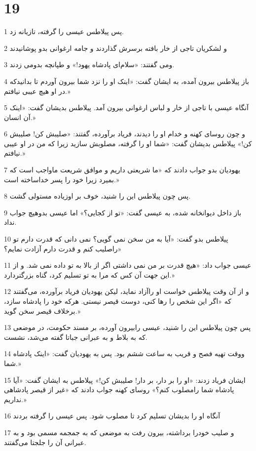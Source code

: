 \chapter{19}

\par 1 پس پیلاطس عیسی را گرفته، تازیانه زد.
\par 2 و لشکریان تاجی از خار بافته برسرش گذاردند و جامه ارغوانی بدو پوشانیدند
\par 3 ومی گفتند: «سلام‌ای پادشاه یهود!» و طپانچه بدومی زدند.
\par 4 باز پیلاطس بیرون آمده، به ایشان گفت: «اینک او را نزد شما بیرون آوردم تا بدانیدکه در او هیچ عیبی نیافتم.»
\par 5 آنگاه عیسی با تاجی از خار و لباس ارغوانی بیرون آمد. پیلاطس بدیشان گفت: «اینک آن انسان.»
\par 6 و چون روسای کهنه و خدام او را دیدند، فریاد برآورده، گفتند: «صلیبش کن! صلیبش کن!» پیلاطس بدیشان گفت: «شما او را گرفته، مصلوبش سازید زیرا که من در او عیبی نیافتم.»
\par 7 یهودیان بدو جواب دادند که «ما شریعتی داریم و موافق شریعت ماواجب است که بمیرد زیرا خود را پسر خداساخته است.»
\par 8 پس چون پیلاطس این را شنید، خوف بر اوزیاده مستولی گشت.
\par 9 باز داخل دیوانخانه شده، به عیسی گفت: «تو از کجایی؟» اما عیسی بدوهیچ جواب نداد.
\par 10 پیلاطس بدو گفت: «آیا به من سخن نمی گویی؟ نمی دانی که قدرت دارم تو راصلیب کنم و قدرت دارم آزادت نمایم؟»
\par 11 عیسی جواب داد: «هیچ قدرت بر من نمی داشتی اگر از بالا به تو داده نمی شد. و از این جهت آن کس که مرا به تو تسلیم کرد، گناه بزرگتردارد.»
\par 12 و از آن وقت پیلاطس خواست او راآزاد نماید، لیکن یهودیان فریاد برآورده، می‌گفتند که «اگر این شخص را رها کنی، دوست قیصر نیستی. هر‌که خود را پادشاه سازد، برخلاف قیصر سخن گوید.»
\par 13 پس چون پیلاطس این را شنید، عیسی رابیرون آورده، بر مسند حکومت، در موضعی که به بلاط و به عبرانی جباتا گفته می‌شد، نشست.
\par 14 ووقت تهیه فصح و قریب به ساعت ششم بود. پس به یهودیان گفت: «اینک پادشاه شما.»
\par 15 ایشان فریاد زدند: «او را بر دار، بر دار! صلیبش کن!» پیلاطس به ایشان گفت: «آیا پادشاه شما رامصلوب کنم؟» روسای کهنه جواب دادند که «غیر از قیصر پادشاهی نداریم.»
\par 16 آنگاه او را بدیشان تسلیم کرد تا مصلوب شود. پس عیسی را گرفته بردند
\par 17 و صلیب خودرا برداشته، بیرون رفت به موضعی که به جمجمه مسمی بود و به عبرانی آن را جلجتا می‌گفتند.
